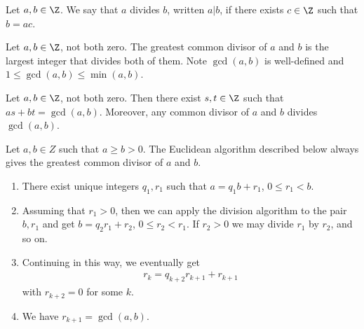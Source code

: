 \documentclass{article}
\begin{document}
\begin{definition}
    Let $a,b\in\Z$. We say that $a$ divides $b$, written $a|b$, if there exists $c\in\Z$
    such that $b=ac$.
\end{definition}

\begin{definition}
    Let $a,b\in\Z$, not both zero. The greatest common divisor of $a$ and $b$ is the largest integer 
    that divides both of them. Note $\gcd(a,b)$ is well-defined and $1\leq\gcd(a,b)\leq\min(a,b)$.
\end{definition}

\begin{lemma}[Bezout]
    Let $a,b\in\Z$, not both zero. Then there exist $s,t\in\Z$ such that 
    $as + bt = \gcd(a,b)$. Moreover, any common divisor of $a$ and $b$ divides $\gcd(a,b)$.  
\end{lemma}

\begin{theorem}
    Let $a,b\in Z$ such that $a\geq b>0$.
    The Euclidean algorithm described below always gives the greatest common divisor of 
    $a$ and $b$.
    \begin{enumerate}
        \item There exist unique integers $q_1,r_1$ such that $a=q_1b+r_1$, $0\leq r_1<b$.
        \item Assuming that $r_1>0$, then we can apply the division algorithm to the pair
            $b,r_1$ and get $b=q_2r_1 + r_2$, $0\leq r_2<r_1$. If $r_2>0$ we may divide 
            $r_1$ by $r_2$, and so on.
        \item Continuing in this way, we eventually get \begin{align*}
            r_k=q_{k+2}r_{k+1}+r_{k+1}
        \end{align*}
        with $r_{k+2}=0$ for some $k$.
        \item We have $r_{k+1}=\gcd(a,b)$.
    \end{enumerate}
\end{theorem}
\end{document}
